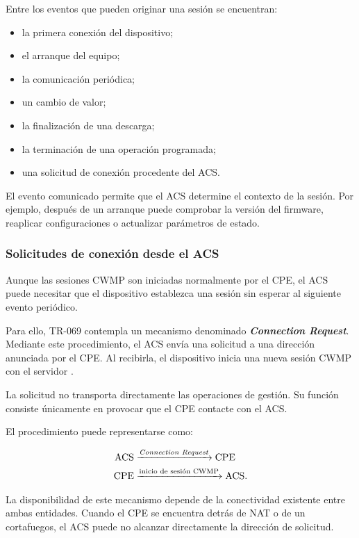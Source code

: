 Entre los eventos que pueden originar una sesión se encuentran:

\begin{itemize}
    \item la primera conexión del dispositivo;
    \item el arranque del equipo;
    \item la comunicación periódica;
    \item un cambio de valor;
    \item la finalización de una descarga;
    \item la terminación de una operación programada;
    \item una solicitud de conexión procedente del ACS.
\end{itemize}

El evento comunicado permite que el ACS determine el contexto de la
sesión. Por ejemplo, después de un arranque puede comprobar la versión del
firmware, reaplicar configuraciones o actualizar parámetros de estado.


\subsubsection*{Solicitudes de conexión desde el ACS}

Aunque las sesiones CWMP son iniciadas normalmente por el CPE, el ACS
puede necesitar que el dispositivo establezca una sesión sin esperar al
siguiente evento periódico.

Para ello, TR-069 contempla un mecanismo denominado
\textbf{\textit{Connection Request}}. Mediante este procedimiento, el ACS
envía una solicitud a una dirección anunciada por el CPE. Al recibirla,
el dispositivo inicia una nueva sesión CWMP con el servidor
\cite{bbf_tr069}.

La solicitud no transporta directamente las operaciones de gestión. Su
función consiste únicamente en provocar que el CPE contacte con el ACS.

El procedimiento puede representarse como:

\[
\begin{aligned}
    \text{ACS}
    &\xrightarrow{\text{\textit{Connection Request}}}
    \text{CPE}\\
    \text{CPE}
    &\xrightarrow{\text{inicio de sesión CWMP}}
    \text{ACS}.
\end{aligned}
\]

La disponibilidad de este mecanismo depende de la conectividad existente
entre ambas entidades. Cuando el CPE se encuentra detrás de NAT o de un
cortafuegos, el ACS puede no alcanzar directamente la dirección de
solicitud.


